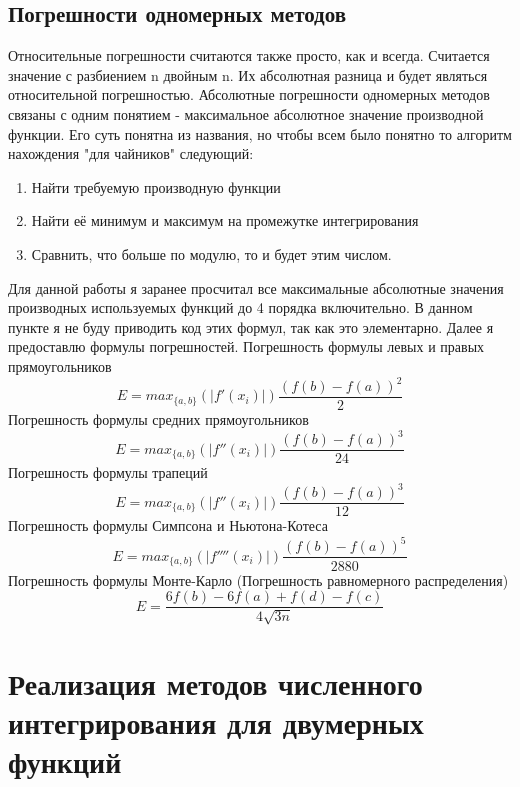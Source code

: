 \documentclass{article}
\begin{document}
\subsection{Погрешности одномерных методов}
Относительные погрешности считаются также просто, как и всегда. Считается значение
с разбиением n двойным n. Их абсолютная разница и будет являться относительной погрешностью. 
Абсолютные погрешности одномерных методов связаны с одним понятием - максимальное абсолютное значение производной функции. Его суть понятна из названия, но чтобы всем было понятно то алгоритм нахождения "для чайников" следующий:
\begin{enumerate}
    \item Найти требуемую производную функции
    \item Найти её минимум и максимум на промежутке интегрирования
    \item Сравнить, что больше по модулю, то и будет этим числом.
\end{enumerate}
Для данной работы я заранее просчитал все максимальные абсолютные значения производных используемых функций до 4 порядка включительно. В данном пункте я не буду приводить код этих формул, так как это элементарно. Далее я предоставлю формулы погрешностей.
\newline
Погрешность формулы левых и правых прямоугольников
$$E = max_{\{a,b\}} (|{f'(x_i)}|)\frac{(f(b)-f(a))^{2}}{2}$$
Погрешность формулы средних прямоугольников
$$E = max_{\{a,b\}} (|{f''(x_i)}|)\frac{(f(b)-f(a))^{3}}{24}$$
Погрешность формулы трапеций
$$E = max_{\{a,b\}} (|{f''(x_i)}|)\frac{(f(b)-f(a))^{3}}{12}$$
Погрешность формулы Симпсона и Ньютона-Котеса
$$E = max_{\{a,b\}} (|{f''''(x_i)}|)\frac{(f(b)-f(a))^{5}}{2880}$$
Погрешность формулы Монте-Карло (Погрешность равномерного распределения)
$$E = \frac{6f(b)-6f(a)+f(d)-f(c)}{4\sqrt{3n}}$$
\section{Реализация методов численного интегрирования для двумерных функций}
\end{document}
